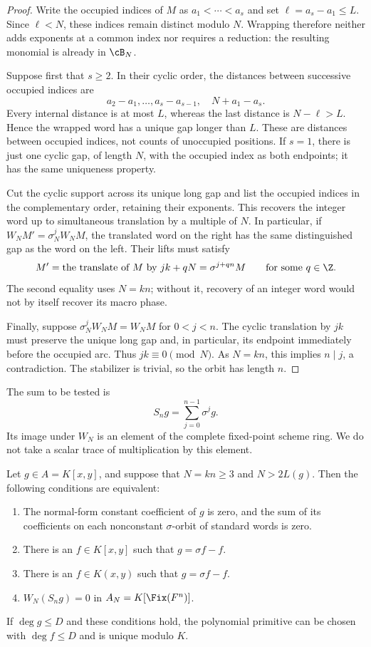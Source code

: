 \begin{proof}
Write the occupied indices of $M$ as
$a_1<\cdots<a_s$ and set $\ell=a_s-a_1\le L$.
Since $\ell<N$, these indices remain distinct modulo $N$.
Wrapping therefore neither adds exponents at a common index nor requires
a reduction: the resulting monomial is already in $\cB_N$.

Suppose first that $s\ge2$.  In their cyclic order, the distances between
successive occupied indices are
\[
 a_2-a_1,\ldots,a_s-a_{s-1},\quad N+a_1-a_s.
\]
Every internal distance is at most $L$, whereas the last distance is
$N-\ell>L$.  Hence the wrapped word has a unique gap longer than $L$.
These are distances between occupied indices, not counts of unoccupied
positions.  If $s=1$, there is just one cyclic gap, of length $N$, with
the occupied index as both endpoints; it has the same uniqueness property.

Cut the cyclic support across its unique long gap and list the occupied
indices in the complementary order, retaining their exponents.  This
recovers the integer word up to simultaneous translation by a multiple
of $N$.  In particular, if $W_NM'=\sigma_N^jW_NM$, the translated word
on the right has the same distinguished gap as the word on the left.
Their lifts must satisfy
\[
 M'=\text{the translate of }M\text{ by }jk+qN
     =\sigma^{j+qn}M
 \qquad\text{for some }q\in\Z.
\]
The second equality uses $N=kn$; without it, recovery of an integer word
would not by itself recover its macro phase.

Finally, suppose $\sigma_N^jW_NM=W_NM$ for $0<j<n$.
The cyclic translation by $jk$ must preserve the unique long gap and,
in particular, its endpoint immediately before the occupied arc.
Thus $jk\equiv0\pmod N$.  As $N=kn$, this implies $n\mid j$, a
contradiction.  The stabilizer is trivial, so the orbit has length $n$.
\end{proof}

The sum to be tested is
\[
 S_ng=\sum_{j=0}^{n-1}\sigma^jg.
\]
Its image under $W_N$ is an element of the complete fixed-point scheme
ring.  We do not take a scalar trace of multiplication by this element.

\begin{theorem}\label{thm:periodic-test}
Let $g\in A=K[x,y]$, and suppose that $N=kn\ge3$ and $N>2L(g)$.
Then the following conditions are equivalent:
\begin{enumerate}
 \item The normal-form constant coefficient of $g$ is zero, and the
       sum of its coefficients on each nonconstant $\sigma$-orbit
       of standard words is zero.
 \item There is an $f\in K[x,y]$ such that $g=\sigma f-f$.
 \item There is an $f\in K(x,y)$ such that $g=\sigma f-f$.
 \item $W_N(S_ng)=0$ in $A_N=K[\Fix(F^n)]$.
\end{enumerate}
If $\deg g\le D$ and these conditions hold, the polynomial primitive
can be chosen with $\deg f\le D$ and is unique modulo $K$.
\end{theorem}

